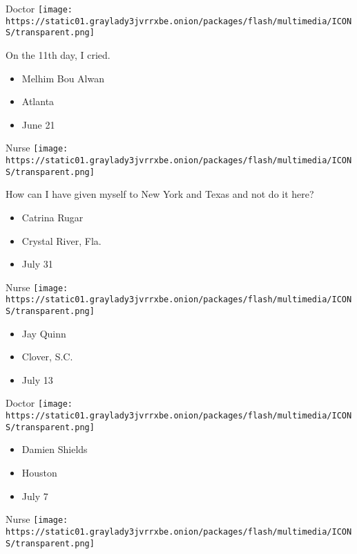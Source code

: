 \protect\hyperlink{item-melhim-bou-alwan}{}

Doctor
\texttt{[image: https://static01.graylady3jvrrxbe.onion/packages/flash/multimedia/ICONS/transparent.png]}

On the 11th day, I cried.

\begin{itemize}
\tightlist
\item
  Melhim Bou Alwan
\item
  Atlanta
\item
  June 21
\end{itemize}

\protect\hyperlink{item-catrina-rugar}{}

Nurse
\texttt{[image: https://static01.graylady3jvrrxbe.onion/packages/flash/multimedia/ICONS/transparent.png]}

How can I have given myself to New York and Texas and not do it here?

\begin{itemize}
\tightlist
\item
  Catrina Rugar
\item
  Crystal River, Fla.
\item
  July 31
\end{itemize}

\protect\hyperlink{item-jay-quinn}{}

Nurse
\texttt{[image: https://static01.graylady3jvrrxbe.onion/packages/flash/multimedia/ICONS/transparent.png]}

\begin{itemize}
\tightlist
\item
  Jay Quinn
\item
  Clover, S.C.
\item
  July 13
\end{itemize}

\protect\hyperlink{item-damien-shields}{}

Doctor
\texttt{[image: https://static01.graylady3jvrrxbe.onion/packages/flash/multimedia/ICONS/transparent.png]}

\begin{itemize}
\tightlist
\item
  Damien Shields
\item
  Houston
\item
  July 7
\end{itemize}

\protect\hyperlink{item-felino-taruc}{}

Nurse
\texttt{[image: https://static01.graylady3jvrrxbe.onion/packages/flash/multimedia/ICONS/transparent.png]}

